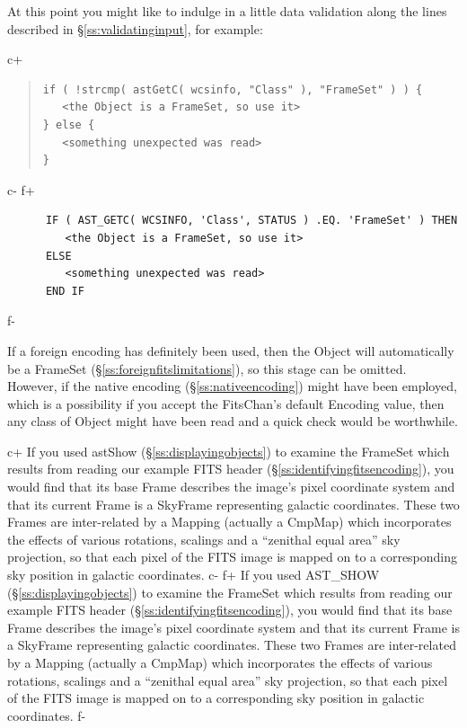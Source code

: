 \documentclass[twoside,11pt]{article}
\newcommand{\secref}[1]{\S\ref{#1}}
\newcommand{\secref}[1]{\ref{#1}}
\begin{document}
At this point you might like to indulge in a little data validation
along the lines described in \secref{ss:validatinginput}, for example:

c+
\begin{quote}
\small
\begin{verbatim}
if ( !strcmp( astGetC( wcsinfo, "Class" ), "FrameSet" ) ) {
   <the Object is a FrameSet, so use it>
} else {
   <something unexpected was read>
}
\end{verbatim}
\normalsize
\end{quote}
c-
f+
\small
\begin{verbatim}
      IF ( AST_GETC( WCSINFO, 'Class', STATUS ) .EQ. 'FrameSet' ) THEN
         <the Object is a FrameSet, so use it>
      ELSE
         <something unexpected was read>
      END IF
\end{verbatim}
\normalsize
f-

If a foreign encoding has definitely been used, then the Object will
automatically be a FrameSet (\secref{ss:foreignfitslimitations}), so
this stage can be omitted. However, if the native encoding
(\secref{ss:nativeencoding}) might have been employed, which is a
possibility if you accept the FitsChan's default Encoding value, then
any class of Object might have been read and a quick check would be
worthwhile.

c+
If you used astShow (\secref{ss:displayingobjects}) to examine the
FrameSet which results from reading our example FITS header
(\secref{ss:identifyingfitsencoding}), you would find that its base
Frame describes the image's pixel coordinate system and that its
current Frame is a SkyFrame representing galactic coordinates. These
two Frames are inter-related by a Mapping (actually a CmpMap) which
incorporates the effects of various rotations, scalings and a
``zenithal equal area'' sky projection, so that each pixel of the FITS
image is mapped on to a corresponding sky position in galactic
coordinates.
c-
f+
If you used AST\_SHOW (\secref{ss:displayingobjects}) to examine the
FrameSet which results from reading our example FITS header
(\secref{ss:identifyingfitsencoding}), you would find that its base
Frame describes the image's pixel coordinate system and that its
current Frame is a SkyFrame representing galactic coordinates. These
two Frames are inter-related by a Mapping (actually a CmpMap) which
incorporates the effects of various rotations, scalings and a
``zenithal equal area'' sky projection, so that each pixel of the FITS
image is mapped on to a corresponding sky position in galactic
coordinates.
f-
\end{document}
